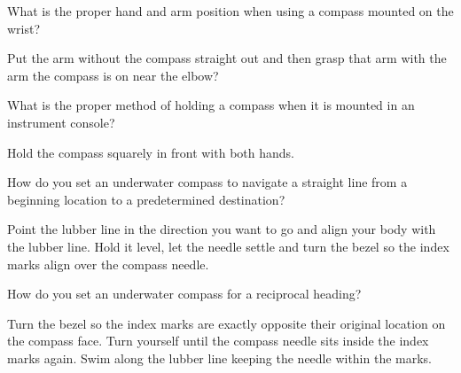 	\begin{qanda}
		\begin{question}
What is the proper hand and arm position when using a compass mounted on the wrist?
		\end{question}

		\begin{answer}
Put the arm without the compass straight out and then grasp that arm with the arm the compass is on near the elbow?
		\end{answer}
	\end{qanda}

	\begin{qanda}
		\begin{question}
What is the proper method of holding a compass when it is mounted in an instrument console?
		\end{question}

		\begin{answer}
Hold the compass squarely in front with both hands.
		\end{answer}
	\end{qanda}

	\begin{qanda}
		\begin{question}
How do you set an underwater compass to navigate a straight line from a beginning location to a predetermined destination?
		\end{question}

		\begin{answer}
Point the lubber line in the direction you want to go and align your body with the lubber line.  Hold it level, let the needle settle and turn the bezel so the index marks align over the compass needle.
		\end{answer}
	\end{qanda}

	\begin{qanda}
		\begin{question}
How do you set an underwater compass for a reciprocal heading?
		\end{question}

		\begin{answer}
Turn the bezel so the index marks are exactly opposite their original location on the compass face.  Turn yourself until the compass needle sits inside the index marks again.  Swim along the lubber line keeping the needle within the marks.
		\end{answer}
	\end{qanda}

